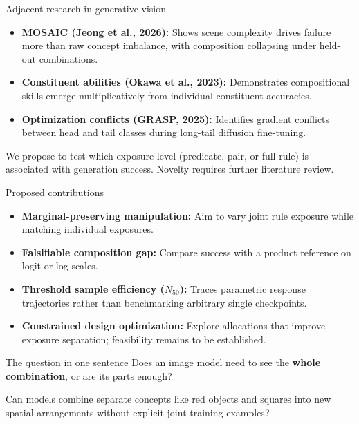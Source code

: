 \documentclass[aspectratio=169,11pt]{beamer}
\begin{document}
\begin{frame}{Adjacent research in generative vision}
\begin{itemize}
\item \textbf{MOSAIC (Jeong et al., 2026):} Shows scene complexity drives failure more than raw concept imbalance, with composition collapsing under held-out combinations.
\item \textbf{Constituent abilities (Okawa et al., 2023):} Demonstrates compositional skills emerge multiplicatively from individual constituent accuracies.
\item \textbf{Optimization conflicts (GRASP, 2025):} Identifies gradient conflicts between head and tail classes during long-tail diffusion fine-tuning.
\end{itemize}
\vspace{2mm}
\normalsize We propose to test which exposure level (predicate, pair, or full rule) is associated with generation success. Novelty requires further literature review.
\end{frame}

\begin{frame}{Proposed contributions}
\begin{itemize}
\item \textbf{Marginal-preserving manipulation:} Aim to vary joint rule exposure while matching individual exposures.
\item \textbf{Falsifiable composition gap:} Compare success with a product reference on logit or log scales.
\item \textbf{Threshold sample efficiency ($N_{50}$):} Traces parametric response trajectories rather than benchmarking arbitrary single checkpoints.
\item \textbf{Constrained design optimization:} Explore allocations that improve exposure separation; feasibility remains to be established.
\end{itemize}
\end{frame}

\begin{frame}{The question in one sentence}
\Large Does an image model need to see the \textbf{whole combination}, or are its parts enough?
\vspace{2mm}
\begin{center}\end{center}
\vspace{1mm}
\normalsize Can models combine separate concepts like red objects and squares into new spatial arrangements without explicit joint training examples?
\end{frame}
\end{document}

